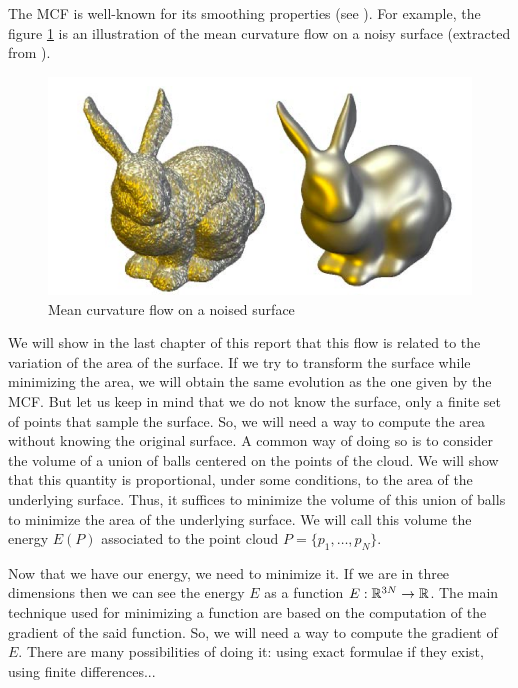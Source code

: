 The MCF is well-known for its smoothing properties (see
\cite{ciomaga2010level}). For example, the figure
\ref{fig:mean-curvature-flow-ex} is an illustration of the mean curvature flow
on a noisy surface (extracted from \cite{clarenz2000anisotropic}).

\begin{figure}[h]
    \centering
    \includegraphics[scale=0.3]{img/mean-curvature-flow-rabbit}
    \caption{Mean curvature flow on a noised surface}
    \label{fig:mean-curvature-flow-ex}
\end{figure}

We will show in the last chapter of this report that this flow is related to the
variation of the area of the surface. If we try to transform the surface while
minimizing the area, we will obtain the same evolution as the one given by the
MCF. But let us keep in mind that we do not know the surface, only a finite set
of points that sample the surface. So, we will need a way to compute the area
without knowing the original surface. A common way of doing so is to consider
the volume of a union of balls centered on the points of the cloud.  We will
show that this quantity is proportional, under some conditions, to the area of
the underlying surface. Thus, it suffices to minimize the volume of this union
of balls to minimize the area of the underlying surface. We will call this
volume the energy $ E(P) $ associated to the point cloud $ P = \{ p_1, \ldots,
p_N \} $.

Now that we have our energy, we need to minimize it. If we are in
three dimensions then we can see the energy $ E $ as a function $ E : \mathbb{R}^{3N}
\to \mathbb{R} $. The main technique used for minimizing a function are based on the
computation of the gradient of the said function. So, we will need a way to
compute the gradient of $ E $. There are many possibilities of doing it:
using exact formulae if they exist, using finite differences...

